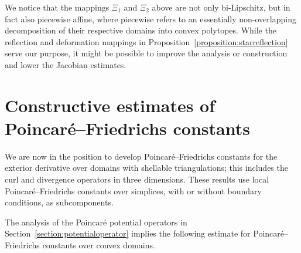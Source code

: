\documentclass[10pt,a4paper]{article}
\begin{document}
\begin{remark}
    We notice that the mappings $\Xi_{1}$ and $\Xi_{2}$ above are not only bi-Lipschitz, but in fact also piecewise affine, 
    where piecewise refers to an essentially non-overlapping decomposition of their respective domains into convex polytopes.
    While the reflection and deformation mappings in Proposition~\ref{proposition:starreflection} serve our purpose,
    it might be possible to improve the analysis or construction and lower the Jacobian estimates. 
\end{remark}



        
        
        
        





        
        
        
        








































\section{Constructive estimates of Poincar\'e--Friedrichs constants}\label{section:poincarefriedrichs}

We are now in the position to develop Poincar\'e--Friedrichs constants for the exterior derivative over domains with shellable triangulations; this includes the curl and divergence operators in three dimensions. 
These results use local Poincar\'e--Friedrichs constants over simplices, 
with or without boundary conditions, as subcomponents. 

The analysis of the Poincar\'e potential operators in Section~\ref{section:potentialoperator}
implies the following estimate for Poincar\'e--Friedrichs constants over convex domains. 
\end{document}
